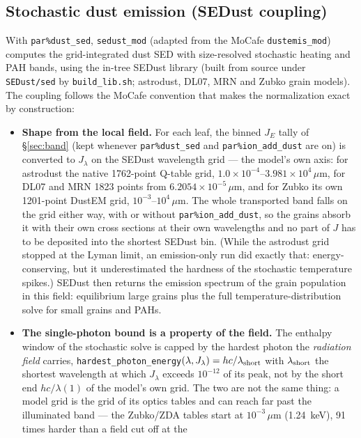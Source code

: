\documentclass[english,a4paper]{my_memo}
\newcommand{\code}[1]{\texttt{#1}}
\begin{document}
\subsection{Stochastic dust emission (SEDust coupling)}
\label{sec:sedust}
With \code{par\%dust\_sed}, \code{sedust\_mod} (adapted from the MoCafe
\code{dustemis\_mod}) computes the grid-integrated dust SED with
size-resolved stochastic heating and PAH bands, using the in-tree
SEDust library (built from source under \code{SEDust/sed} by
\code{build\_lib.sh}; astrodust, DL07, MRN and Zubko grain models).  The
coupling follows the MoCafe convention that makes the normalization
exact by construction:
\begin{itemize}
\item \textbf{Shape from the local field.}  For each leaf, the binned
  $J_E$ tally of \S\ref{sec:band} (kept whenever \code{par\%dust\_sed} and \code{par\%ion\_add\_dust} are on)
  is converted to $J_\lambda$ on the SEDust wavelength grid
  --- the model's own axis: for astrodust the native 1762-point Q-table
  grid, $1.0{\times}10^{-4}$--$3.981{\times}10^{4}\,\mu$m, for DL07 and MRN
  1823 points from $6.2054{\times}10^{-5}\,\mu$m, and for Zubko its own
  1201-point DustEM grid, $10^{-3}$--$10^{4}\,\mu$m.  The whole transported
  band falls on the grid either way, with or without
  \code{par\%ion\_add\_dust}, so the grains absorb it with their own cross
  sections at their own wavelengths and no part of $J$ has to be deposited into
  the shortest SEDust bin.  (While the astrodust grid stopped at the Lyman
  limit, an emission-only run did exactly that: energy-conserving, but it
  underestimated the hardness of the stochastic temperature spikes.)  SEDust then
  returns the emission spectrum of the grain population in this field:
  equilibrium large grains plus the full temperature-distribution solve
  for small grains and PAHs.
\item \textbf{The single-photon bound is a property of the field.}  The
  enthalpy window of the stochastic solve is capped by the hardest photon
  the \emph{radiation field} carries, \code{hardest\_photon\_energy}$(\lambda,
  J_\lambda) = hc/\lambda_{\rm short}$ with $\lambda_{\rm short}$ the
  shortest wavelength at which $J_\lambda$ exceeds $10^{-12}$ of its peak,
  not by the short end $hc/\lambda(1)$ of the model's own grid.  The two are
  not the same thing: a model grid is the grid of its optics tables and can
  reach far past the illuminated band --- the Zubko/ZDA tables start at
  $10^{-3}\,\mu$m (1.24~keV), 91 times harder than a field cut off at the

\end{itemize}
\end{document}
